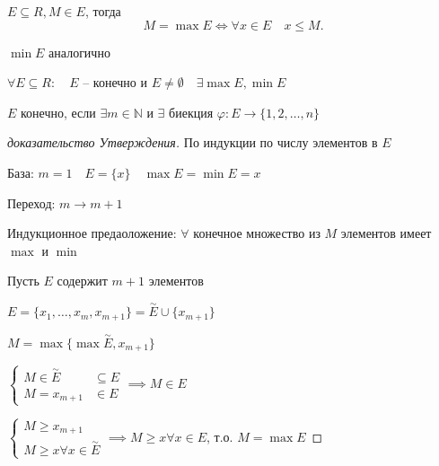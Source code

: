 \documentclass{book}
\newcommand\N{\ensuremath{\mathbb{N}}}
\renewcommand\O{\ensuremath{\emptyset}}
\renewcommand\phi{\varphi}
\theoremstyle{definition}
\begin{document}
    \begin{definition}
        $E\subseteq R, M\in E$, тогда \[
        M = \max E \iff  \forall x\in E\quad x\leqslant M
        .\] 

        $\min E$ аналогично
    \end{definition}

    \begin{statement}
        $\forall E\subseteq R:\quad E$ -- конечно и $E\neq \O \quad \exists \max E, \min E$
    \end{statement}
    \begin{definition}
        $E$ конечно, если $\exists  m\in \N $ и $\exists $ биекция $\phi:E \to \{1, 2, \ldots, n\}$
    \end{definition}
    \begin{proof}
        [доказательство Утверждения]
        По индукции по числу элементов в $E$

        База: $m=1\quad E = \{x\}\quad \max E = \min E  = x$

        Переход: $m\to m+1$

        Индукционное предаоложение: $\forall $ конечное множество из $M$ элементов имеет $\max$ и $\min$

        Пусть $E$ содержит $m+1$ элементов

        $E = \{x_1, \ldots, x_{m}, x_{m+1} \} = \overset{\sim }E \cup \{x_{m+1}\}$

        $M = \max \{\max \overset{\sim }E, x_{m+1}\}$

        $\begin{cases}
            M\in \overset{\sim }E&\subseteq E\\
            M = x_{m+1}&\in E
        \end{cases} \implies M\in E$

        $\begin{cases}
            M\geqslant x_{m+1}\\
            M\geqslant x \forall x\in \overset{\sim }E
        \end{cases} \implies  M\geqslant x \forall x\in E$, т.о. $M = \max E$
    \end{proof}
\end{document}
